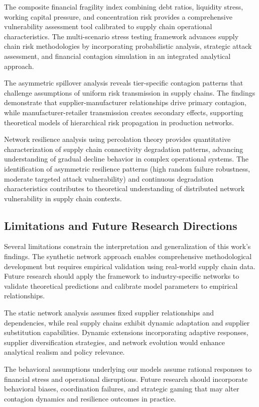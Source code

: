 \documentclass[a4 paper, 11pt,twoside]{article}
\newcommand{\0}{\Bf{0}}
\theoremstyle{definition}
\begin{document}
The composite financial fragility index combining debt ratios, liquidity stress, working capital pressure, and concentration risk provides a comprehensive vulnerability assessment tool calibrated to supply chain operational characteristics. The multi-scenario stress testing framework advances supply chain risk methodologies by incorporating probabilistic analysis, strategic attack assessment, and financial contagion simulation in an integrated analytical approach.

The asymmetric spillover analysis reveals tier-specific contagion patterns that challenge assumptions of uniform risk transmission in supply chains. The findings demonstrate that supplier-manufacturer relationships drive primary contagion, while manufacturer-retailer transmission creates secondary effects, supporting theoretical models of hierarchical risk propagation in production networks.

Network resilience analysis using percolation theory provides quantitative characterization of supply chain connectivity degradation patterns, advancing understanding of gradual decline behavior in complex operational systems. The identification of asymmetric resilience patterns (high random failure robustness, moderate targeted attack vulnerability) and continuous degradation characteristics contributes to theoretical understanding of distributed network vulnerability in supply chain contexts.

\subsection{Limitations and Future Research Directions}

Several limitations constrain the interpretation and generalization of this work's findings. The synthetic network approach enables comprehensive methodological development but requires empirical validation using real-world supply chain data. Future research should apply the framework to industry-specific networks to validate theoretical predictions and calibrate model parameters to empirical relationships.

The static network analysis assumes fixed supplier relationships and dependencies, while real supply chains exhibit dynamic adaptation and supplier substitution capabilities. Dynamic extensions incorporating adaptive responses, supplier diversification strategies, and network evolution would enhance analytical realism and policy relevance.

The behavioral assumptions underlying our models assume rational responses to financial stress and operational disruptions. Future research should incorporate behavioral biases, coordination failures, and strategic gaming that may alter contagion dynamics and resilience outcomes in practice.
\end{document}
